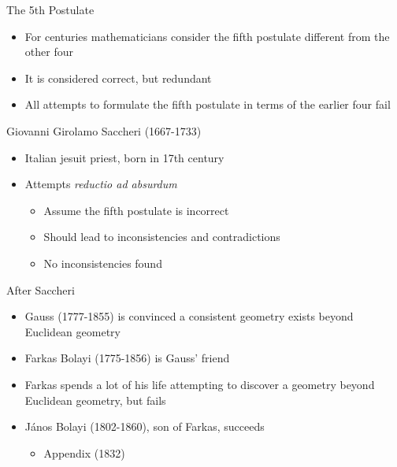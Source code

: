 \documentclass[utf8]{beamer}
\begin{document}
\begin{frame}{The 5th Postulate}
\begin{itemize}
\item For centuries mathematicians consider the fifth postulate different from the other four
\item It is considered correct, but redundant
\item All attempts to formulate the fifth postulate in terms of the earlier four fail
\end{itemize}
\end{frame}

\begin{frame}{Giovanni Girolamo Saccheri (1667-1733)}
\begin{itemize}
\item Italian jesuit priest, born in 17th century
\item Attempts \emph{reductio ad absurdum}
\begin{itemize}
\item Assume the fifth postulate is incorrect
\item Should lead to inconsistencies and contradictions
\item No inconsistencies found
\end{itemize}
\end{itemize}
\end{frame}

\begin{frame}{After Saccheri}
\begin{itemize}
\item Gauss (1777-1855) is convinced a consistent geometry exists beyond Euclidean geometry
\item Farkas Bolayi (1775-1856) is Gauss' friend
\item Farkas spends a lot of his life attempting to discover a geometry beyond Euclidean geometry, but fails
\item J{\'a}nos Bolayi (1802-1860), son of Farkas, succeeds
\begin{itemize}
\item Appendix (1832)
\end{itemize}
\end{itemize}
\end{frame}
\end{document}

